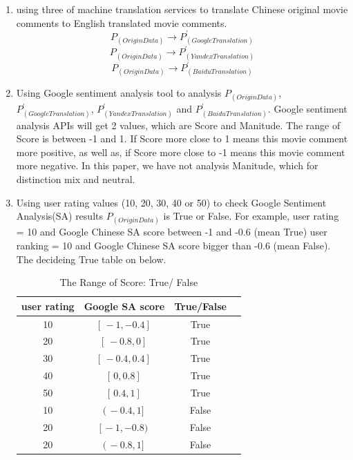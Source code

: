 \documentclass[conference]{IEEEtran}
\begin{document}
\begin{CJK*}{UTF8}{gbsn}
\begin{enumerate}
  \item using three of machine translation services to translate Chinese
    original movie comments to English translated movie comments.
    $$P_{(Origin Data)} \rightarrow P^{\prime}_{(Google Translation)}$$
    $$P_{(Origin Data)} \rightarrow P^{\prime}_{(Yandex Translation)}$$
    $$P_{(Origin Data)} \rightarrow P^{\prime}_{(Baidu Translation)}$$
  \item Using Google sentiment analysis tool to analysis $P_{(Origin Data)}$,
    $P^{\prime}_{(Google Translation)}$, $ P^{\prime}_{(Yandex Translation)}$ and $
    P^{\prime}_{(Baidu Translation)}$. Google sentiment analysis APIs will get 2
    values, which are Score and Manitude. The range of Score is between -1 and
    1. If Score more close to 1 means this movie comment more positive, as well
    as, if Score more close to -1 means this movie comment more negative. In
    this paper, we have not analysis Manitude, which for distinction mix and neutral.
  \item\label{itm:testingProcedure3} Using user rating values (10, 20, 30, 40 or 50) to check Google
    Sentiment Analysis(SA) results $P_{(Origin Data)} $ is True or False. For
    example, user rating = 10 and Google Chinese SA score between -1
    and -0.6 (mean True) user ranking = 10 and Google Chinese SA score bigger
    than -0.6 (mean False). The decideing True table on below.\\
     \begin{table}[h!]
      \caption {The Range of Score: True/ False}
     \begin{center}
      \begin{tabular}{|c|c|c|c|}
        \hline
        user rating & Google SA score & True/False \\
        \hline\hline
        10 & $[ \, -1, -0.4 ] \,$ & True \\
        \hline
        20 & $[ \, -0.8, 0 ] \,$ & True \\
        \hline
        30 & $[ \, -0.4, 0.4 ] \,$ & True \\
        \hline
        40 & $[ \, 0, 0.8 ] \,$ & True \\
        \hline
        50 & $[ \, 0.4, 1 ] \,$ & True \\
        \hline \hline
        10 & $( \, -0.4, 1 ] \,$ & False \\
        \hline
        20 & $[ \, -1, -0.8) \,$ & False \\
        \hline
        20 & $( \, -0.8, 1] \,$ & False \\

\end{tabular}
\end{center}
\end{table}
\end{enumerate}
\end{CJK*}
\end{document}
